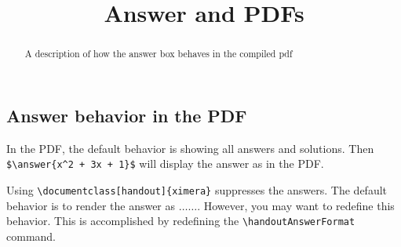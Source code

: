 \documentclass{ximera}
\title{Answer and PDFs}
\begin{document}
\begin{abstract}
    A description of how the answer box behaves in the compiled pdf
\end{abstract}
\maketitle


    \subsection*{Answer behavior in the PDF}

        In the PDF, the default behavior is showing all answers and solutions. Then \verb|$\answer{x^2 + 3x + 1}$| will display the answer as  in the PDF.
                
        Using \verb|\documentclass[handout]{ximera}| suppresses the answers. The default behavior is to render the answer as $\ldots\ldots$. However, you may want to redefine this behavior. This is accomplished by redefining the \verb|\handoutAnswerFormat| command. 
        
\end{document}
